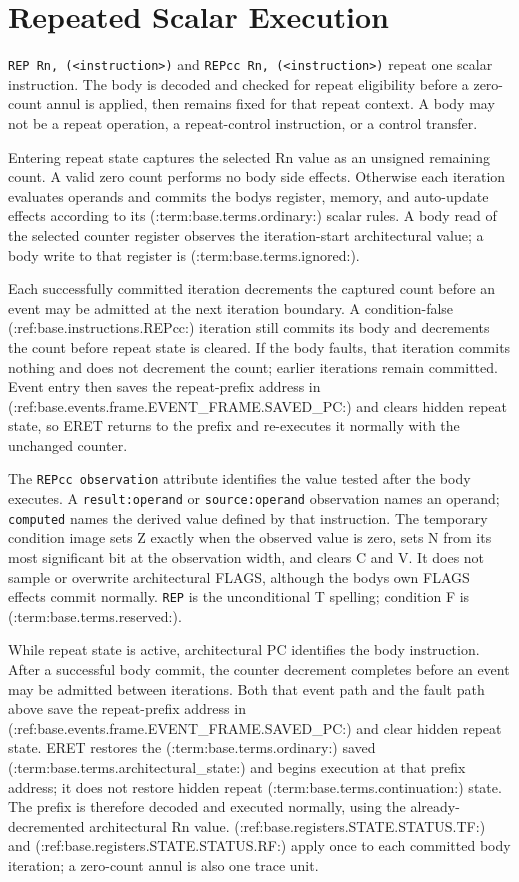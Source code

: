 \clearpage
\section{Repeated Scalar Execution}\label{page:repeated-scalar-execution}

\texttt{REP Rn, (<instruction>)} and \texttt{REPcc Rn, (<instruction>)} repeat one scalar instruction. The body is
decoded and checked for repeat eligibility before a zero-count annul is applied, then remains fixed for that repeat
context. A body may not be a repeat operation, a repeat-control instruction, or a control transfer.

Entering repeat state captures the selected Rn value as an unsigned remaining count. A valid zero count performs no
body side effects. Otherwise each iteration evaluates operands and commits the body\textquotesingle{}s register, memory, and auto-update
effects according to its (:term:base.terms.ordinary:) scalar rules. A body read of the selected counter register observes the
iteration-start architectural value; a body write to that register is (:term:base.terms.ignored:).

Each successfully committed iteration decrements the captured count before an event may be admitted at the next
iteration boundary. A condition-false (:ref:base.instructions.REPcc:) iteration still commits its body and decrements the count before
repeat state is cleared. If the body faults, that iteration commits nothing and does not decrement the count; earlier
iterations remain committed. Event entry then saves the repeat-prefix address in (:ref:base.events.frame.EVENT_FRAME.SAVED_PC:) and clears hidden repeat
state, so ERET returns to the prefix and re-executes it normally with the unchanged counter.

The \texttt{REPcc observation} attribute identifies the value tested after the body executes. A
\texttt{result:operand} or \texttt{source:operand} observation names an operand; \texttt{computed} names the derived
value defined by that instruction. The temporary condition image sets Z exactly when the observed value is zero,
sets N from its most significant bit at the observation width, and clears C and V. It does not sample or overwrite
architectural FLAGS, although the body\textquotesingle{}s own FLAGS effects commit normally. \texttt{REP} is the unconditional T
spelling; condition F is (:term:base.terms.reserved:).

While repeat state is active, architectural PC identifies the body instruction. After a successful body commit, the
counter decrement completes before an event may be admitted between iterations. Both that event path and the
fault path above save the repeat-prefix address in (:ref:base.events.frame.EVENT_FRAME.SAVED_PC:) and clear hidden repeat state. ERET restores the
(:term:base.terms.ordinary:) saved (:term:base.terms.architectural_state:) and begins execution at that prefix address; it does not restore hidden
repeat (:term:base.terms.continuation:) state. The prefix is therefore decoded and executed normally, using the already-decremented
architectural Rn value. (:ref:base.registers.STATE.STATUS.TF:) and (:ref:base.registers.STATE.STATUS.RF:) apply once to each committed body iteration; a zero-count annul is also one trace
unit.
